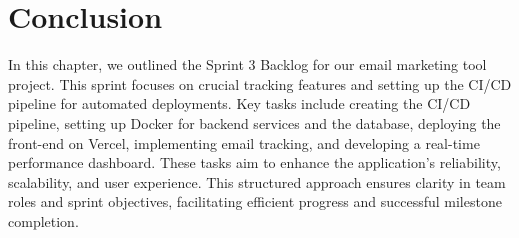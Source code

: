 \section*{Conclusion}


In this chapter, we outlined the Sprint 3 Backlog for our email marketing tool project. This sprint focuses on crucial tracking features and setting up the CI/CD pipeline for automated deployments. Key tasks include creating the CI/CD pipeline, setting up Docker for backend services and the database, deploying the front-end on Vercel, implementing email tracking, and developing a real-time performance dashboard. These tasks aim to enhance the application's reliability, scalability, and user experience. This structured approach ensures clarity in team roles and sprint objectives, facilitating efficient progress and successful milestone completion.